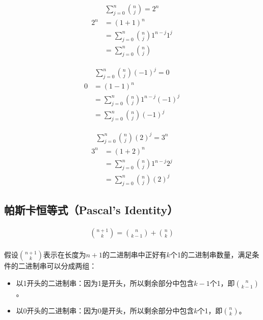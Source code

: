 \begin{tcolorbox}
	\begin{align}
		\sum_{j=0}^{n} {n \choose j} = 2^n
	\end{align}
	\begin{align*}
		2^n & = (1 + 1)^n                                \\
		    & = \sum_{j=0}^{n} {n \choose j} 1^{n-j} 1^j \\
		    & = \sum_{j=0}^{n} {n \choose j}
	\end{align*}
\end{tcolorbox}

\begin{tcolorbox}
	\begin{align}
		\sum_{j=0}^{n} {n \choose j} (-1)^j = 0
	\end{align}
	\begin{align*}
		0 & = (1 - 1)^n                                   \\
		  & = \sum_{j=0}^{n} {n \choose j} 1^{n-j} (-1)^j \\
		  & = \sum_{j=0}^{n} {n \choose j} (-1)^j
	\end{align*}
\end{tcolorbox}

\begin{tcolorbox}
	\begin{align}
		\sum_{j=0}^{n} {n \choose j} (2)^j = 3^n
	\end{align}
	\begin{align*}
		3^n & = (1 + 2)^n                                \\
		    & = \sum_{j=0}^{n} {n \choose j} 1^{n-j} 2^j \\
		    & = \sum_{j=0}^{n} {n \choose j} (2)^j
	\end{align*}
\end{tcolorbox}

\vspace{0.5cm}

\subsection{帕斯卡恒等式（Pascal's Identity）}

\begin{tcolorbox}
	\begin{align}
		{n+1 \choose k} = {n \choose k-1} + {n \choose k}
	\end{align}
	\\
	假设$ n + 1 \choose k $表示在长度为$ n + 1 $的二进制串中正好有$ k $个1的二进制串数量，满足条件的二进制串可以分成两组：
	\begin{itemize}
		\item 以1开头的二进制串：因为1是开头，所以剩余部分中包含$ k - 1 $个1，即$ n \choose k - 1 $。
		\item 以0开头的二进制串：因为0是开头，所以剩余部分中包含$ k $个1，即$ n \choose k $。
	\end{itemize}
\end{tcolorbox}


